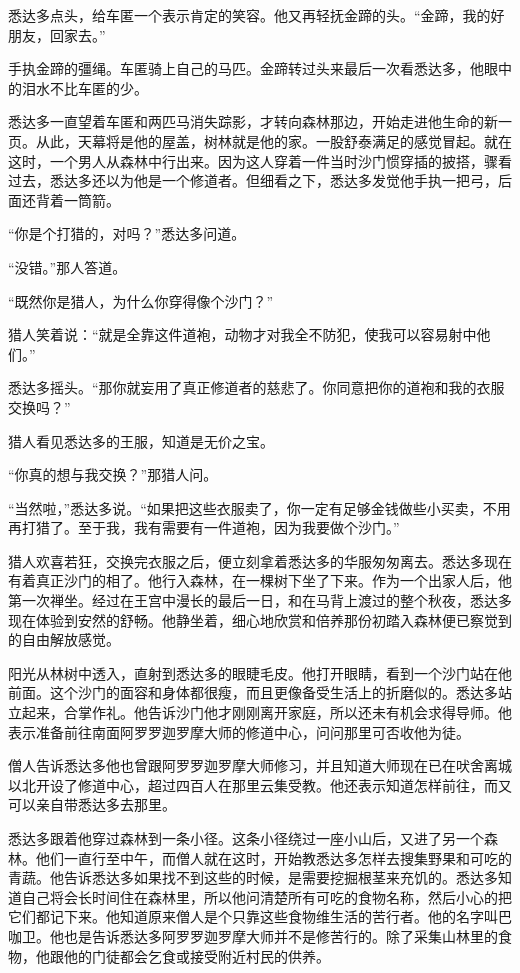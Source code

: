 \documentclass[12pt,twoside,openany]{book}
\begin{document}
悉达多点头，给车匿一个表示肯定的笑容。他又再轻抚金蹄的头。“金蹄，我的好朋友，回家去。”

手执金蹄的彊绳。车匿骑上自己的马匹。金蹄转过头来最后一次看悉达多，他眼中的泪水不比车匿的少。

悉达多一直望着车匿和两匹马消失踪影，才转向森林那边，开始走进他生命的新一页。从此，天幕将是他的屋盖，树林就是他的家。一股舒泰满足的感觉冒起。就在这时，一个男人从森林中行出来。因为这人穿着一件当时沙门惯穿插的披搭，骤看过去，悉达多还以为他是一个修道者。但细看之下，悉达多发觉他手执一把弓，后面还背着一筒箭。

“你是个打猎的，对吗？”悉达多问道。

“没错。”那人答道。

“既然你是猎人，为什么你穿得像个沙门？”

猎人笑着说：“就是全靠这件道袍，动物才对我全不防犯，使我可以容易射中他们。”

悉达多摇头。“那你就妄用了真正修道者的慈悲了。你同意把你的道袍和我的衣服交换吗？”

猎人看见悉达多的王服，知道是无价之宝。

“你真的想与我交换？”那猎人问。

“当然啦，”悉达多说。“如果把这些衣服卖了，你一定有足够金钱做些小买卖，不用再打猎了。至于我，我有需要有一件道袍，因为我要做个沙门。”

猎人欢喜若狂，交换完衣服之后，便立刻拿着悉达多的华服匆匆离去。悉达多现在有着真正沙门的相了。他行入森林，在一棵树下坐了下来。作为一个出家人后，他第一次禅坐。经过在王宫中漫长的最后一日，和在马背上渡过的整个秋夜，悉达多现在体验到安然的舒畅。他静坐着，细心地欣赏和倍养那份初踏入森林便已察觉到的自由解放感觉。

阳光从林树中透入，直射到悉达多的眼睫毛皮。他打开眼睛，看到一个沙门站在他前面。这个沙门的面容和身体都很瘦，而且更像备受生活上的折磨似的。悉达多站立起来，合掌作礼。他告诉沙门他才刚刚离开家庭，所以还未有机会求得导师。他表示准备前往南面阿罗罗迦罗摩大师的修道中心，问问那里可否收他为徒。

僧人告诉悉达多他也曾跟阿罗罗迦罗摩大师修习，并且知道大师现在已在吠舍离城以北开设了修道中心，超过四百人在那里云集受教。他还表示知道怎样前往，而又可以亲自带悉达多去那里。

悉达多跟着他穿过森林到一条小径。这条小径绕过一座小山后，又进了另一个森林。他们一直行至中午，而僧人就在这时，开始教悉达多怎样去搜集野果和可吃的青蔬。他告诉悉达多如果找不到这些的时候，是需要挖掘根茎来充饥的。悉达多知道自己将会长时间住在森林里，所以他问清楚所有可吃的食物名称，然后小心的把它们都记下来。他知道原来僧人是个只靠这些食物维生活的苦行者。他的名字叫巴咖卫。他也是告诉悉达多阿罗罗迦罗摩大师并不是修苦行的。除了采集山林里的食物，他跟他的门徒都会乞食或接受附近村民的供养。
\end{document}
